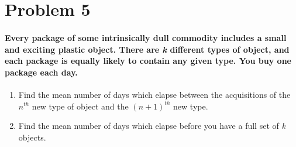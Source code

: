 \documentclass[12pt,letterpaper]{article}
\begin{document}
    \newpage


    \section*{Problem 5}
    \paragraph*{Every package of some intrinsically dull commodity includes a small and exciting plastic object. There are \textit{k} different types of object, and each package is equally likely to contain any given type. You buy one package each day.}
    
    \begin{enumerate}[label=(\alph*)]
        \item Find the mean number of days which elapse between the acquisitions of the $n^{th}$ new type of object and the $(n+1)^{th}$ new type.
        \item Find the mean number of days which elapse before you have a full set of \textit{k} objects.
    \end{enumerate}
    \vspace*{0.5cm}
\end{document}
